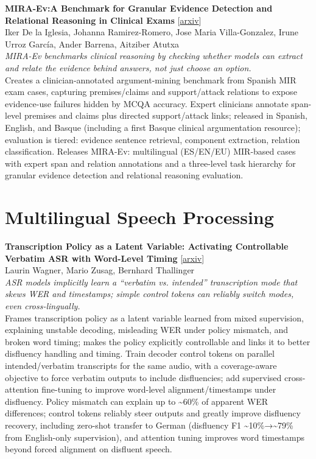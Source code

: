 \documentclass[12pt,letterpaper]{article}
\begin{document}
\medskip

{\small\textbf{MIRA-Ev:A Benchmark for Granular Evidence Detection and Relational Reasoning in Clinical Exams}} {\scriptsize[\href{https://arxiv.org/abs/2607.19201}{arxiv}]}\\
{\scriptsize Iker De la Iglesia, Johanna Ramirez-Romero, Jose Maria Villa-Gonzalez, Irune Urroz García, Ander Barrena, Aitziber Atutxa}\\

{\small\textit{MIRA-Ev benchmarks clinical reasoning by checking whether models can extract and relate the evidence behind answers, not just choose an option.}}\\[1pt]
{\footnotesize Creates a clinician-annotated argument-mining benchmark from Spanish MIR exam cases, capturing premises/claims and support/attack relations to expose evidence-use failures hidden by MCQA accuracy. Expert clinicians annotate span-level premises and claims plus directed support/attack links; released in Spanish, English, and Basque (including a first Basque clinical argumentation resource); evaluation is tiered: evidence sentence retrieval, component extraction, relation classification. Releases MIRA-Ev: multilingual (ES/EN/EU) MIR-based cases with expert span and relation annotations and a three-level task hierarchy for granular evidence detection and relational reasoning evaluation.}

\medskip


\section*{Multilingual Speech Processing}

{\small\textbf{Transcription Policy as a Latent Variable: Activating Controllable Verbatim ASR with Word-Level Timing}} {\scriptsize[\href{https://arxiv.org/abs/2607.18934}{arxiv}]}\\
{\scriptsize Laurin Wagner, Mario Zusag, Bernhard Thallinger}\\

{\small\textit{ASR models implicitly learn a ``verbatim vs. intended'' transcription mode that skews WER and timestamps; simple control tokens can reliably switch modes, even cross-lingually.}}\\[1pt]
{\footnotesize Frames transcription policy as a latent variable learned from mixed supervision, explaining unstable decoding, misleading WER under policy mismatch, and broken word timing; makes the policy explicitly controllable and links it to better disfluency handling and timing. Train decoder control tokens on parallel intended/verbatim transcripts for the same audio, with a coverage-aware objective to force verbatim outputs to include disfluencies; add supervised cross-attention fine-tuning to improve word-level alignment/timestamps under disfluency. Policy mismatch can explain up to \textasciitilde{}60\% of apparent WER differences; control tokens reliably steer outputs and greatly improve disfluency recovery, including zero-shot transfer to German (disfluency F1 \textasciitilde{}10\%→\textasciitilde{}79\% from English-only supervision), and attention tuning improves word timestamps beyond forced alignment on disfluent speech.}
\end{document}
